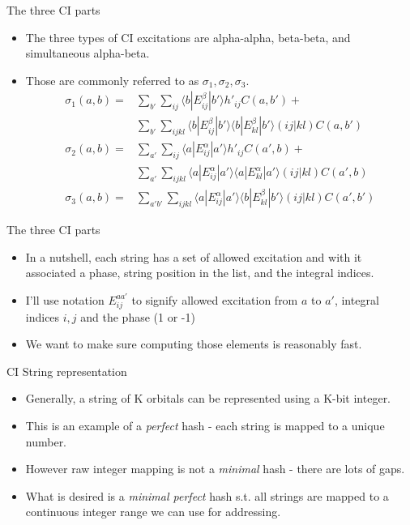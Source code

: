 \documentclass{beamer}
\newcommand{\bra}[1]{\langle #1|}
\newcommand{\ket}[1]{|#1\rangle}
\begin{document}
\begin{frame}{The three CI parts}
\begin{itemize}
\item The three types of CI excitations are alpha-alpha, beta-beta, and simultaneous alpha-beta.
\item Those are commonly referred to as $\sigma_1, \sigma_2, \sigma_3$. \\
\begin{align*}
\sigma_1(a,b) =& \sum_{b'} \sum_{ij}   { \bra{b} E_{ij}^{\beta} \ket{b'} h'_{ij} C(a,b') } + \\
& \sum_{b'} \sum_{ijkl} { \bra{b} E_{ij}^{\beta} \ket{b'} \bra{b} E_{kl}^{\beta} \ket{b'} (ij|kl) C(a,b') }
\\
\sigma_2(a,b) =&
  \sum_{a'} \sum_{ij}   { \bra{a} E_{ij}^{\alpha} \ket{a'} h'_{ij} C(a',b) } + \\
& \sum_{a'} \sum_{ijkl} { \bra{a} E_{ij}^{\alpha} \ket{a'} \bra{a} E_{kl}^{\alpha} \ket{a'} (ij|kl) C(a',b) }
 \\
\sigma_3(a,b) =& \sum_{a'b'} \sum_{ijkl} {
  \bra{a} E_{ij}^{\alpha} \ket{a'} \bra{b} E_{kl}^{\beta} \ket{b'} (ij|kl) C(a',b')
}
\end{align*}
\end{itemize}
\end{frame}

\begin{frame}{The three CI parts}
\begin{itemize}
\item In a nutshell, each string has a set of allowed excitation and with it associated a phase,
  string position in the list, and the integral indices.
\item I'll use notation $E^{aa'}_{ij}$ to signify allowed excitation from $a$ to $a'$,
  integral indices $i,j$ and the phase (1 or -1)
\item We want to make sure computing those elements is reasonably fast.
\end{itemize}
\end{frame}


\begin{frame}{CI String representation}
\begin{itemize}
\item Generally, a string of K orbitals can be represented using a K-bit integer.
\item This is an example of a {\em perfect} hash - each string is mapped to a unique number.
\item However raw integer mapping is not a {\em minimal} hash - there are lots of gaps.
\item What is desired is a {\em minimal perfect} hash s.t. all strings are mapped to a continuous integer range we can use for addressing.
\end{itemize}
\end{frame}
\end{document}

